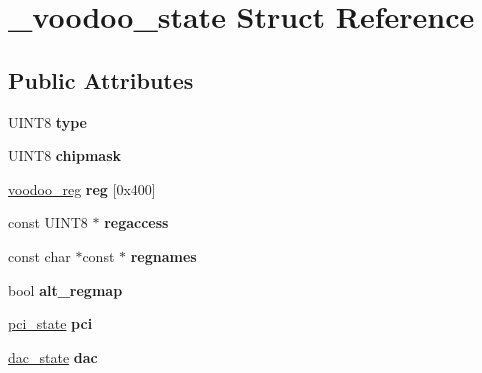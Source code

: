 \hypertarget{struct__voodoo__state}{\section{\-\_\-voodoo\-\_\-state Struct Reference}
\label{struct__voodoo__state}
}
\subsection*{Public Attributes}
\begin{DoxyCompactItemize}
\item 
\hypertarget{struct__voodoo__state_a05793b79aa7f3aea8bd0ea991f824542}{U\-I\-N\-T8 {\bfseries type}}\label{struct__voodoo__state_a05793b79aa7f3aea8bd0ea991f824542}

\item 
\hypertarget{struct__voodoo__state_a7bfbe20fbc4278aa25cd0ed7762c327a}{U\-I\-N\-T8 {\bfseries chipmask}}\label{struct__voodoo__state_a7bfbe20fbc4278aa25cd0ed7762c327a}

\item 
\hypertarget{struct__voodoo__state_adb4bb4113e0ce165d28fc2b6f9b0409d}{\hyperlink{union__voodoo__reg}{voodoo\-\_\-reg} {\bfseries reg} \mbox{[}0x400\mbox{]}}\label{struct__voodoo__state_adb4bb4113e0ce165d28fc2b6f9b0409d}

\item 
\hypertarget{struct__voodoo__state_a37e22a36cde1d58601d67b2dd1de414d}{const U\-I\-N\-T8 $\ast$ {\bfseries regaccess}}\label{struct__voodoo__state_a37e22a36cde1d58601d67b2dd1de414d}

\item 
\hypertarget{struct__voodoo__state_a035503886a891bf136c3fe882e5eb411}{const char $\ast$const $\ast$ {\bfseries regnames}}\label{struct__voodoo__state_a035503886a891bf136c3fe882e5eb411}

\item 
\hypertarget{struct__voodoo__state_a2a1dd0a967c04dad81519d1bafe500ae}{bool {\bfseries alt\-\_\-regmap}}\label{struct__voodoo__state_a2a1dd0a967c04dad81519d1bafe500ae}

\item 
\hypertarget{struct__voodoo__state_a458e129a7ec6e7be5bddbb5350798a38}{\hyperlink{struct__pci__state}{pci\-\_\-state} {\bfseries pci}}\label{struct__voodoo__state_a458e129a7ec6e7be5bddbb5350798a38}

\item 
\hypertarget{struct__voodoo__state_a10cedffb6f1065e4a204e5d2d8889746}{\hyperlink{struct__dac__state}{dac\-\_\-state} {\bfseries dac}}\label{struct__voodoo__state_a10cedffb6f1065e4a204e5d2d8889746}


\end{DoxyCompactItemize}
